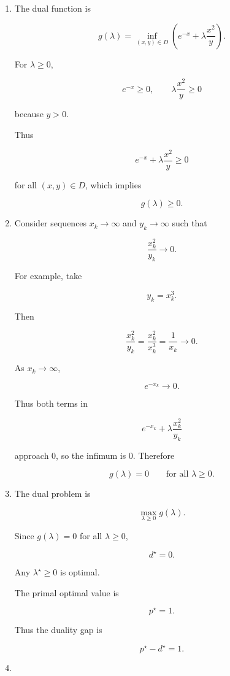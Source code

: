\documentclass[
	12pt,
]{fphw}
\begin{document}
\begin{enumerate}
Hence the optimal value is

\[
p^\star=1.
\]

\item[(b)]

The dual function is

\[
g(\lambda)=\inf_{(x,y)\in D}\left(e^{-x}+\lambda\frac{x^2}{y}\right).
\]

For \(\lambda\ge0\),

\[
e^{-x}\ge0, \qquad \lambda\frac{x^2}{y}\ge0
\]

because \(y>0\).

Thus

\[
e^{-x}+\lambda\frac{x^2}{y}\ge0
\]

for all \((x,y)\in D\), which implies

\[
g(\lambda)\ge0.
\]

\item[(c)]

Consider sequences \(x_k\to\infty\) and \(y_k\to\infty\) such that

\[
\frac{x_k^2}{y_k}\to0.
\]

For example, take

\[
y_k=x_k^3.
\]

Then

\[
\frac{x_k^2}{y_k}=\frac{x_k^2}{x_k^3}=\frac{1}{x_k}\to0.
\]

As \(x_k\to\infty\),

\[
e^{-x_k}\to0.
\]

Thus both terms in

\[
e^{-x_k}+\lambda\frac{x_k^2}{y_k}
\]

approach 0, so the infimum is 0. Therefore

\[
g(\lambda)=0
\qquad \text{for all } \lambda\ge0.
\]

\item[(d)]

The dual problem is

\[
\max_{\lambda\ge0} g(\lambda).
\]

Since \(g(\lambda)=0\) for all \(\lambda\ge0\),

\[
d^\star=0.
\]

Any \(\lambda^\star\ge0\) is optimal.

The primal optimal value is

\[
p^\star=1.
\]

Thus the duality gap is

\[
p^\star-d^\star=1.
\]

\item[(e)]


\end{enumerate}
\end{document}
